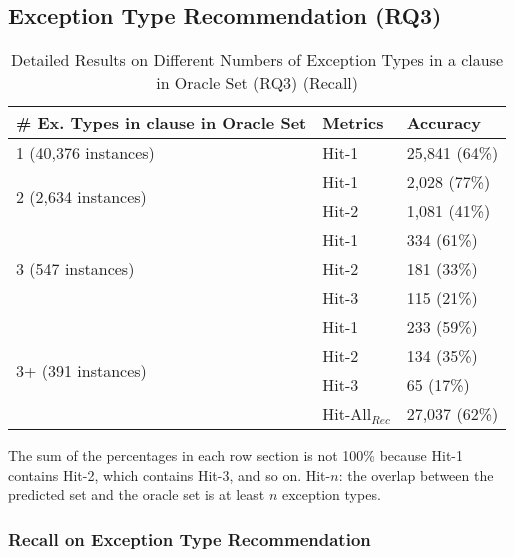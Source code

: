 \subsection{Exception Type Recommendation (RQ3)}
\label{sec:rq3}

\begin{table}[t]
  \caption{Detailed Results on Different Numbers of Exception Types in a
     clause in Oracle Set (RQ3) (Recall)}
  \vspace{-12pt}
	{\small
	  \begin{center}
            \tabcolsep 3.5pt
			\renewcommand{\arraystretch}{1}
			\begin{tabular}{p{4.5cm}<{\centering}|p{1.3cm}<{\centering}|p{1.5cm}<{\centering}}
				\hline
				\# Ex. Types in \code{catch} clause in Oracle Set & Metrics &  Accuracy\\
				\hline
				\multirow{1}{*}{1 (40,376 instances)}   & Hit-1  & 25,841 (64\%) \\
				\hline
				\multirow{2}{*}{2 (2,634 instances)}  & Hit-1   & 2,028 (77\%) \\
				& Hit-2         &  1,081 (41\%) \\
				\hline
				\multirow{3}{*}{3 (547 instances)}  & Hit-1    & 334 (61\%) \\
				& Hit-2     & 181 (33\%)\\
				& Hit-3     & 115 (21\%) \\
				\hline
				\multirow{4}{*}{3+ (391 instances)}  & Hit-1   & 233 (59\%) \\
				& Hit-2     & 134 (35\%) \\
				& Hit-3     & 65 (17\%)\\
                                \hline
                                & Hit-All$_{Rec}$ & 27,037 (62\%)\\
				\hline
			\end{tabular}
	                The sum of the percentages in each row section is not 100\% because Hit-1 contains Hit-2, which contains Hit-3, and so on. Hit-$n$: the overlap between the predicted set and the oracle set is at least $n$ exception types.
			\label{tab:recall-3}
		\end{center}
	}
\end{table}

\subsubsection{{\bf Recall on Exception Type Recommendation}}
\label{sec:req3-recall}

